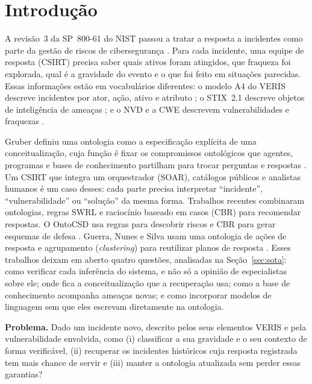 \documentclass[12pt]{article}
\begin{document}
\section{Introdução}
\label{sec:intro}

A revisão~3 da SP~800-61 do NIST passou a tratar a resposta a incidentes como parte da gestão de riscos de cibersegurança \cite{nist80061r3}. Para cada incidente, uma equipe de resposta (CSIRT) precisa saber quais ativos foram atingidos, que fraqueza foi explorada, qual é a gravidade do evento e o que foi feito em situações parecidas. Essas informações estão em vocabulários diferentes: o modelo A4 do VERIS descreve incidentes por ator, ação, ativo e atributo \cite{veris}; o STIX~2.1 descreve objetos de inteligência de ameaças \cite{stix21}; e o NVD e a CWE descrevem vulnerabilidades e fraquezas \cite{nvd,cwe}.

Gruber definiu uma ontologia como a especificação explícita de uma conceitualização, cuja função é fixar os compromissos ontológicos que agentes, programas e bases de conhecimento partilham para trocar perguntas e respostas \cite{gruber1993}. Um CSIRT que integra um orquestrador (SOAR), catálogos públicos e analistas humanos é um caso desses: cada parte precisa interpretar ``incidente'', ``vulnerabilidade'' ou ``solução'' da mesma forma. Trabalhos recentes combinaram ontologias, regras SWRL e raciocínio baseado em casos (CBR) para recomendar respostas. O OntoCSD usa regras para descobrir riscos e CBR para gerar esquemas de defesa \cite{wu2024ontocsd}. Guerra, Nunes e Silva usam uma ontologia de ações de resposta e agrupamento (\emph{clustering}) para reutilizar planos de resposta \cite{guerra2025cases}. Esses trabalhos deixam em aberto quatro questões, analisadas na Seção~\ref{sec:sota}: como verificar cada inferência do sistema, e não só a opinião de especialistas sobre ele; onde fica a conceitualização que a recuperação usa; como a base de conhecimento acompanha ameaças novas; e como incorporar modelos de linguagem sem que eles escrevam diretamente na ontologia.

\textbf{Problema.} Dado um incidente novo, descrito pelos seus elementos VERIS e pela vulnerabilidade envolvida, como (i) classificar a sua gravidade e o seu contexto de forma verificável, (ii) recuperar os incidentes históricos cuja resposta registrada tem mais chance de servir e (iii) manter a ontologia atualizada sem perder essas garantias?
\end{document}
